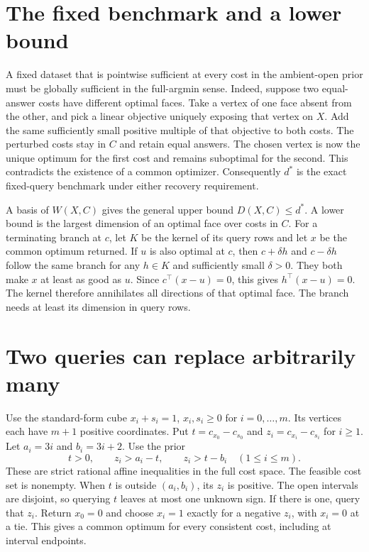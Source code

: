 \documentclass[11pt,a4paper]{amsart}
\begin{document}
\section{The fixed benchmark and a lower bound}
A fixed dataset that is pointwise sufficient at every cost in the ambient-open prior must be globally sufficient in the full-argmin sense. Indeed, suppose two equal-answer costs have different optimal faces. Take a vertex of one face absent from the other, and pick a linear objective uniquely exposing that vertex on $X$. Add the same sufficiently small positive multiple of that objective to both costs. The perturbed costs stay in $C$ and retain equal answers. The chosen vertex is now the unique optimum for the first cost and remains suboptimal for the second. This contradicts the existence of a common optimizer. Consequently $d^*$ is the exact fixed-query benchmark under either recovery requirement.

A basis of $W(X,C)$ gives the general upper bound $D(X,C)\leq d^*$. A lower bound is the largest dimension of an optimal face over costs in $C$. For a terminating branch at $c$, let $K$ be the kernel of its query rows and let $x$ be the common optimum returned. If $u$ is also optimal at $c$, then $c+\delta h$ and $c-\delta h$ follow the same branch for any $h\in K$ and sufficiently small $\delta>0$. They both make $x$ at least as good as $u$. Since $c^\top(x-u)=0$, this gives $h^\top(x-u)=0$. The kernel therefore annihilates all directions of that optimal face. The branch needs at least its dimension in query rows.

\section{Two queries can replace arbitrarily many}
Use the standard-form cube $x_i+s_i=1$, $x_i,s_i\geq0$ for $i=0,\ldots,m$. Its vertices each have $m+1$ positive coordinates. Put $t=c_{x_0}-c_{s_0}$ and $z_i=c_{x_i}-c_{s_i}$ for $i\geq1$. Let $a_i=3i$ and $b_i=3i+2$. Use the prior
\[
       t>0,\qquad z_i>a_i-t,\qquad z_i>t-b_i\quad(1\leq i\leq m).
\]
These are strict rational affine inequalities in the full cost space. The feasible cost set is nonempty. When $t$ is outside $(a_i,b_i)$, its $z_i$ is positive. The open intervals are disjoint, so querying $t$ leaves at most one unknown sign. If there is one, query that $z_i$. Return $x_0=0$ and choose $x_i=1$ exactly for a negative $z_i$, with $x_i=0$ at a tie. This gives a common optimum for every consistent cost, including at interval endpoints.
\end{document}
